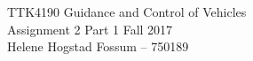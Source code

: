 \documentclass[a4paper]{article}
\begin{document}
\begin{titlepage}
\begin{center}
\Large TTK4190 Guidance and Control of Vehicles \\
\large{Assignment 2 Part 1}
\vspace{8pt}
\large Fall 2017 \\
\vspace{8pt}
\large Helene Hogstad Fossum -- 750189
\end{center}
\vspace{8pt}
\end{titlepage}




\newpage


\end{document}
